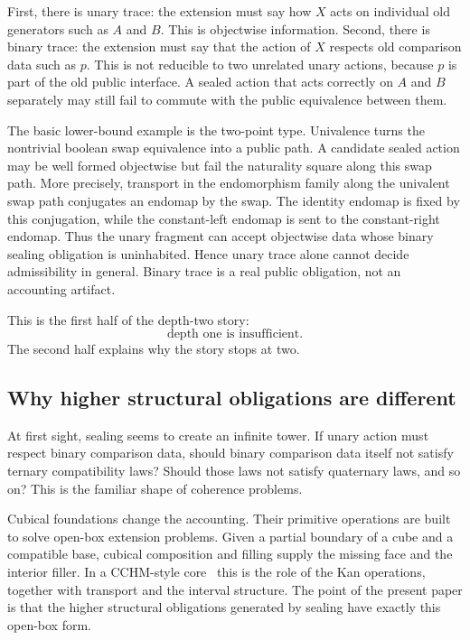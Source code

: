 \documentclass{lmcs}
\begin{document}
First, there is unary trace: the extension must say how \(X\) acts on individual
old generators such as \(A\) and \(B\).  This is objectwise information.  Second,
there is binary trace: the extension must say that the action of \(X\) respects
old comparison data such as \(p\).  This is not reducible to two unrelated unary
actions, because \(p\) is part of the old public interface.  A sealed action that
acts correctly on \(A\) and \(B\) separately may still fail to commute with the
public equivalence between them.

The basic lower-bound example is the two-point type.  Univalence turns the
nontrivial boolean swap equivalence into a public path.  A candidate sealed
action may be well formed objectwise but fail the naturality square along this
swap path.  More precisely, transport in the endomorphism family along the
univalent swap path conjugates an endomap by the swap.  The identity endomap is
fixed by this conjugation, while the constant-left endomap is sent to the
constant-right endomap.  Thus the unary fragment can accept objectwise data
whose binary sealing obligation is uninhabited.  Hence unary trace alone cannot
decide admissibility in general.  Binary trace is a real public obligation, not
an accounting artifact.

This is the first half of the depth-two story:
\[
  \text{depth one is insufficient.}
\]
The second half explains why the story stops at two.

\subsection{Why higher structural obligations are different}

At first sight, sealing seems to create an infinite tower.  If unary action must
respect binary comparison data, should binary comparison data itself not satisfy
ternary compatibility laws?  Should those laws not satisfy quaternary laws, and
so on?  This is the familiar shape of coherence problems.

Cubical foundations change the accounting.  Their primitive operations are built
to solve open-box extension problems.  Given a partial boundary of a cube and a
compatible base, cubical composition and filling supply the missing face and the
interior filler.  In a CCHM-style core~\cite{cubical} this is the role of the
Kan operations, together with transport and the interval structure.  The point
of the present paper is that the higher structural obligations generated by
sealing have exactly this open-box form.
\end{document}
